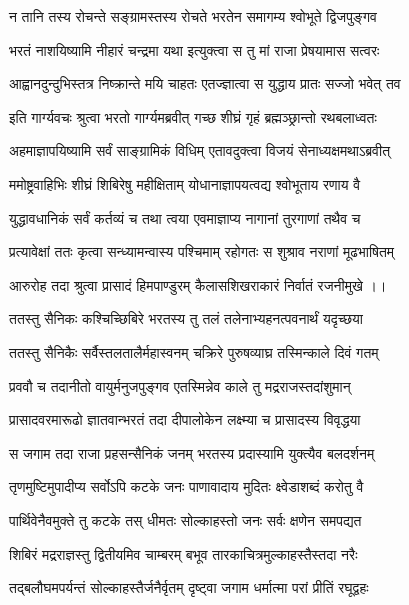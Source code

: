 \twolineshloka
{न तानि तस्य रोचन्ते सङ्ग्रामस्तस्य रोचते}
{भरतेन समागम्य श्वोभूते द्विजपुङ्गव}%

\twolineshloka
{भरतं नाशयिष्यामि नीहारं चन्द्रमा यथा}
{इत्युक्त्वा स तु मां राजा प्रेषयामास सत्वरः}%

\twolineshloka
{आह्वानदुन्दुभिस्तत्र निष्क्रान्ते मयि चाहतः}
{एतज्ज्ञात्वा स युद्धाय प्रातः सज्जो भवेत् तव}%


\twolineshloka
{इति गार्ग्यवचः श्रुत्वा भरतो गार्ग्यमब्रवीत्}
{गच्छ शीघ्रं गृहं ब्रह्मञ्छ्रान्तो रथबलाध्वतः}%

\twolineshloka
{अहमाज्ञापयिष्यामि सर्वं साङ्ग्रामिकं विधिम्}
{एतावदुक्त्वा विजयं सेनाध्यक्षमथाऽब्रवीत्}%

\twolineshloka
{ममोष्ट्रवाहिभिः शीघ्रं शिबिरेषु महीक्षिताम्}
{योधानाज्ञापयत्वद्य श्वोभूताय रणाय वै} %

\twolineshloka
{युद्धावधानिकं सर्वं कर्तव्यं च तथा त्वया}
{एवमाज्ञाप्य नागानां तुरगाणां तथैव च}%

\twolineshloka
{प्रत्यावेक्षां ततः कृत्वा सन्ध्यामन्वास्य पश्चिमाम्}
{रहोगतः स शुश्राव नराणां मूढभाषितम्}%

\twolineshloka
{आरुरोह तदा श्रुत्वा प्रासादं हिमपाण्डुरम्}
{कैलासशिखराकारं निर्वातं रजनीमुखे ।।}%

\twolineshloka
{ततस्तु सैनिकः कश्चिच्छिबिरे भरतस्य तु}
{तलं तलेनाभ्यहनत्पवनार्थं यदृच्छया}%

\twolineshloka
{ततस्तु सैनिकैः सर्वैस्तलतालैर्महास्वनम्}
{चक्रिरे पुरुषव्याघ्र तस्मिन्काले दिवं गतम्}%

\twolineshloka
{प्रववौ च तदानीतो वायुर्मनुजपुङ्गव}
{एतस्मिन्नेव काले तु मद्रराजस्तदांशुमान्}%

\twolineshloka
{प्रासादवरमारूढो ज्ञातवान्भरतं तदा}
{दीपालोकेन लक्ष्म्या च प्रासादस्य विवृद्धया}%

\twolineshloka
{स जगाम तदा राजा प्रहसन्सैनिकं जनम्}
{भरतस्य प्रदास्यामि युक्त्यैव बलदर्शनम्}%

\twolineshloka
{तृणमुष्टिमुपादीप्य सर्वोऽपि कटके जनः}
{पाणावादाय मुदितः क्ष्वेडाशब्दं करोतु वै}%

\twolineshloka
{पार्थिवेनैवमुक्ते तु कटके तस् धीमतः}
{सोल्काहस्तो जनः सर्वः क्षणेन समपद्यत} %

\twolineshloka
{शिबिरं मद्रराज्ञस्तु द्वितीयमिव चाम्बरम्}
{बभूव तारकाचित्रमुल्काहस्तैस्तदा नरैः}%

\twolineshloka
{तद्बलौघमपर्यन्तं सोल्काहस्तैर्जनैर्वृतम्}
{दृष्ट्वा जगाम धर्मात्मा परां प्रीतिं रघूद्वहः}%

